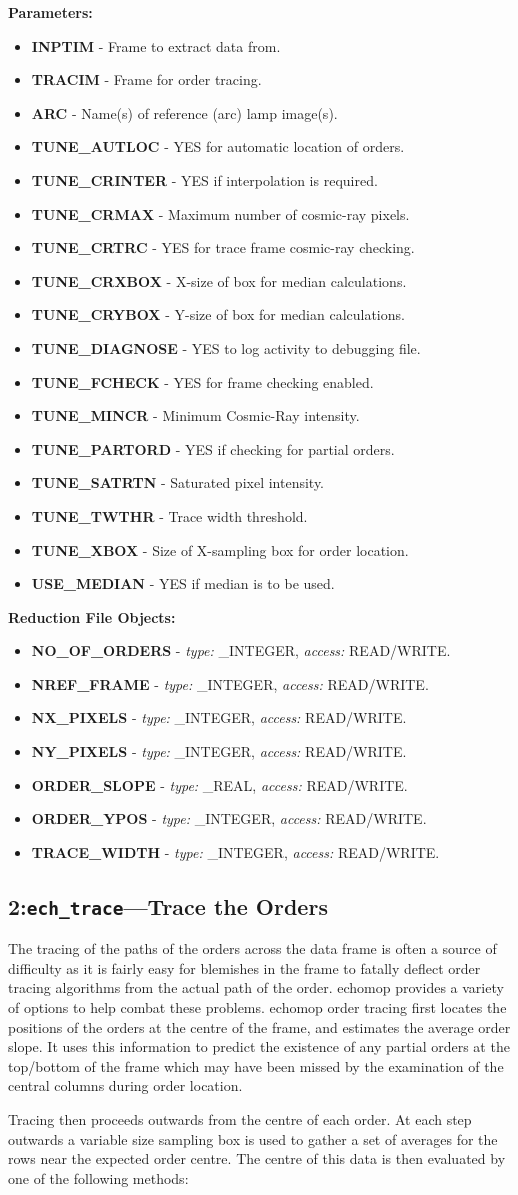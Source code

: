 \documentclass[11pt,twoside]{article}
\makeatletter
\newcommand{\stardocinitials}  {SUN}
\newcommand{\stardocnumber}    {152.4}
\newcommand{\stardocname}{\stardocinitials /\stardocnumber}
\newcommand{\htmlref}[2]{#1}
\newcommand{\xlabel}[1]{}
\newcommand{\myindex}[1]{\index{#1}}
\renewcommand{\myindex}[1]{}
\newcommand{\cmdname}{\begingroup \catcode`\_=12 \realcmdname}
\newcommand{\realcmdname}[1]{\endgroup\texttt{#1}}
\newlength{\sstbannerlength}
\newlength{\sstcaptionlength}
\newcommand{\echtask}[4]{
   \goodbreak
   \rule{\textwidth}{0.5mm}
   \vspace{-7ex}
   \newline
   \settowidth{\sstbannerlength}{{\Large {\bf #3}}}
   \setlength{\sstcaptionlength}{\textwidth}
   \addtolength{\sstbannerlength}{0.5em}
   \addtolength{\sstcaptionlength}{-2.0\sstbannerlength}
   \addtolength{\sstcaptionlength}{-5.0pt}
   \parbox[t]{\sstbannerlength}{\flushleft{\Large {\bf #3}}}
   \parbox[t]{\sstcaptionlength}{\center{\Large #4}}
   \parbox[t]{\sstbannerlength}{\flushright{\Large {\bf #3}}}
   \label{#1}\label{#2}
   \markboth{#3}{\stardocname}
   \uppercase{\myindex{#2@\protect\cmdname{#2}}}
}
\renewcommand{\echtask}[4]
{
  \subsection{\xlabel{#1}\xlabel{#2}\label{#1}\label{#2}#3---#4}
  \markboth{#3}{\stardocname}
}
\newcommand{\echpars}[1]{
{\bf Parameters:\vspace*{6pt}\\}
    #1
}
\renewcommand{\echpars}[1]{
{\bf Parameters:}
\begin{itemize}
#1
\end{itemize}
}
\newcommand{\epar}[3]
{
    \hspace*{5mm}\makebox[50mm][l]{\bf #1} #2 (p~\pageref{par_#3}.)\\
}
\renewcommand{\epar}[3]
{\item \htmlref{{\bf #1}}{par_#3} - #2}
\newcommand{\lepar}[3]
{
    \hspace*{5mm}\makebox[50mm][l]{\bf #1} #2 (p~\pageref{par_#3}.)
}
\renewcommand{\lepar}[3]
{\item \htmlref{{\bf #1}}{par_#3} - #2}
\newcommand{\echredobj}[1]{
{\bf Reduction File Objects:\vspace*{6pt}\\}
      \hspace*{5mm}\makebox[50mm][l]{Object}\makebox[25mm][l]{Type}{Access}\\
      #1
}
\renewcommand{\echredobj}[1]{
{\bf Reduction File Objects:}
\begin{itemize}
#1
\end{itemize}
}
\newcommand{\eobj}[3]
{
    \hspace*{5mm}\makebox[50mm][l]{\bf #1}\makebox[25mm][l]{\tt #2}{\tt #3}\\
}
\renewcommand{\eobj}[3]
{\item {\bf #1} - {\it type:} #2, {\it access:} #3.}
\newcommand{\leobj}[3]
{
    \hspace*{5mm}\makebox[50mm][l]{\bf #1}\makebox[25mm][l]{\tt #2}{\tt #3}
}
\renewcommand{\leobj}[3]
{\item {\bf #1} - {\it type:} #2, {\it access:} #3.}
\makeatother
\begin{document}
\echpars{
\epar{INPTIM}{Frame to extract data from.}{INPTIM}
\epar{TRACIM}{Frame for order tracing.}{TRACIM}
\epar{ARC}{Name(s) of reference (arc) lamp image(s).}{ARC}
\epar{TUNE\_AUTLOC}{YES for automatic location of orders.}{TUNE_AUTLOC}
\epar{TUNE\_CRINTER}{YES if interpolation is required.}{TUNE_CRINTER}
\epar{TUNE\_CRMAX}{Maximum number of cosmic-ray pixels.}{TUNE_CRMAX}
\epar{TUNE\_CRTRC}{YES for trace frame cosmic-ray checking.}{TUNE_CRTRC}
\epar{TUNE\_CRXBOX}{X-size of box for median calculations.}{TUNE_CRXBOX}
\epar{TUNE\_CRYBOX}{Y-size of box for median calculations.}{TUNE_CRYBOX}
\epar{TUNE\_DIAGNOSE}{YES to log activity to debugging file.}{TUNE_DIAGNOSE}
\epar{TUNE\_FCHECK}{YES for frame checking enabled.}{TUNE_FCHECK}
\epar{TUNE\_MINCR}{Minimum Cosmic-Ray intensity.}{TUNE_MINCR}
\epar{TUNE\_PARTORD}{YES if checking for partial orders.}{TUNE_PARTORD}
\epar{TUNE\_SATRTN}{Saturated pixel intensity.}{TUNE_SATRTN}
\epar{TUNE\_TWTHR}{Trace width threshold.}{TUNE_TWTHR}
\epar{TUNE\_XBOX}{Size of X-sampling box for order location.}{TUNE_XBOX}
\lepar{USE\_MEDIAN}{YES if median is to be used.}{USE_MEDIAN}
}

\echredobj{
\eobj{NO\_OF\_ORDERS}{\_INTEGER}{READ/WRITE}
\eobj{NREF\_FRAME}{\_INTEGER}{READ/WRITE}
\eobj{NX\_PIXELS}{\_INTEGER}{READ/WRITE}
\eobj{NY\_PIXELS}{\_INTEGER}{READ/WRITE}
\eobj{ORDER\_SLOPE}{\_REAL}{READ/WRITE}
\eobj{ORDER\_YPOS}{\_INTEGER}{READ/WRITE}
\leobj{TRACE\_WIDTH}{\_INTEGER}{READ/WRITE}
}

\echtask{option2}{ech_trace}{2:{\tt ech\_trace}}{Trace the Orders}

The tracing of the paths of the orders across the data frame is often a
source of difficulty as it is fairly easy for blemishes in the frame to
fatally deflect order tracing algorithms from the actual path of the
order. {\sc echomop} provides a variety of options to help combat these
problems. \myindex{Order!tracing} \myindex{Trace!order paths} \myindex{Partial
orders} {\sc echomop} order tracing first locates the positions of the orders
at the centre of the frame, and estimates the average order slope. It
uses this information to predict the existence of any partial orders at
the top/bottom of the frame which may have been missed by the
examination of the central columns during order location.

Tracing then proceeds outwards from the centre of each order. At each
step outwards a variable size sampling box  is used to gather a set of
averages for the rows near the expected order centre. The centre of this
data is then evaluated by one of the following methods:
\end{document}
